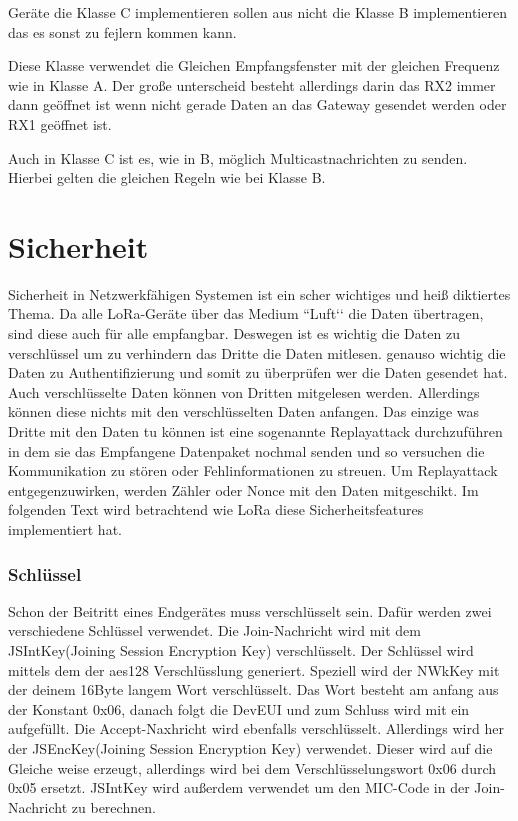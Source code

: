 \documentclass[a4paper,12pt]{article}
\begin{document}
            Geräte die Klasse C implementieren sollen aus nicht die Klasse B implementieren das es sonst zu fejlern 
            kommen kann.

            Diese Klasse verwendet die Gleichen Empfangsfenster mit der gleichen Frequenz wie in Klasse A. Der große 
            unterscheid besteht allerdings darin das RX2 immer dann geöffnet ist wenn nicht gerade Daten an das 
            Gateway gesendet werden oder RX1 geöffnet ist. 

            Auch in Klasse C ist es, wie in B, möglich Multicastnachrichten zu senden. Hierbei gelten die gleichen 
            Regeln wie bei Klasse B.

    \section{Sicherheit} \label{sec:Sicherheit}  
        Sicherheit in Netzwerkfähigen Systemen ist ein scher wichtiges und heiß diktiertes Thema. Da alle LoRa-Geräte 
        über das Medium ``Luft‘‘ die Daten übertragen, sind diese auch für alle empfangbar. Deswegen ist es wichtig 
        die Daten zu verschlüssel um zu verhindern das Dritte die Daten mitlesen. genauso wichtig die Daten zu 
        Authentifizierung und somit zu überprüfen wer die Daten gesendet hat. Auch verschlüsselte Daten können von 
        Dritten mitgelesen werden. Allerdings können diese nichts mit den verschlüsselten Daten anfangen. Das einzige 
        was Dritte mit den Daten tu können ist eine sogenannte Replayattack durchzuführen in dem sie das Empfangene 
        Datenpaket nochmal senden und so versuchen die Kommunikation zu stören oder Fehlinformationen zu streuen. Um 
        Replayattack entgegenzuwirken, werden Zähler oder Nonce mit den Daten mitgeschikt. Im folgenden Text wird 
        betrachtend wie LoRa diese Sicherheitsfeatures implementiert hat.

        \subsubsection{Schlüssel}
            Schon der Beitritt eines Endgerätes muss verschlüsselt sein. Dafür werden zwei verschiedene Schlüssel 
            verwendet. Die Join-Nachricht wird mit dem JSIntKey(Joining Session Encryption Key) verschlüsselt. Der 
            Schlüssel wird mittels dem der aes128 Verschlüsslung generiert. Speziell wird der NWkKey mit der deinem 
            16Byte langem Wort verschlüsselt. Das Wort besteht am anfang aus der Konstant 0x06, danach folgt die DevEUI 
            und zum Schluss wird mit ein aufgefüllt. Die Accept-Naxhricht wird ebenfalls verschlüsselt. Allerdings wird 
            her der JSEncKey(Joining Session Encryption Key) verwendet. Dieser wird auf die Gleiche weise erzeugt, 
            allerdings wird bei dem Verschlüsselungswort 0x06 durch 0x05 ersetzt. JSIntKey wird außerdem verwendet um den 
            MIC-Code in der Join-Nachricht zu berechnen.
\end{document}
